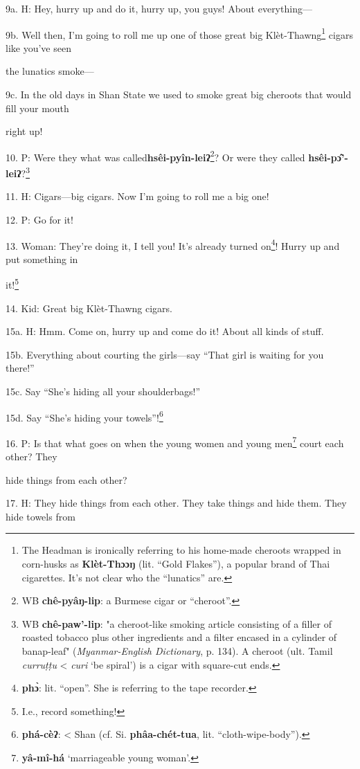 9a. H: Hey, hurry up and do it, hurry up, you guys! About everything---

9b. Well then, I'm going to roll me up one of those great big Klèt-Thawng\footnote{The Headman is ironically referring to his home-made cheroots wrapped in corn-husks as \textbf{Klèt-Thɔɔŋ} (lit. ``Gold Flakes''), a popular brand of Thai cigarettes. It's not clear who the ``lunatics'' are.}
cigars like you've seen

the lunatics smoke---

9c. In the old days in Shan State we used to smoke great big cheroots that would
fill your mouth

right up!

10. P: Were they what was called\textbf{hsêi-pyîn-leiʔ}\footnote{WB \textbf{chê-pyâŋ-lip}: a Burmese cigar or ``cheroot''.}? Or were they
called \textbf{hsêi-pɔ̂'-leiʔ}?\footnote{WB \textbf{chê-paw'-lip}: "a cheroot-like smoking article consisting of a filler of roasted tobacco plus other ingredients and a filter encased in a cylinder of banap-leaf" (\textit{Myanmar-English Dictionary}, p. 134). A cheroot (ult. Tamil \textit{curruṭṭu} < \textit{curi} `be spiral') is a cigar with square-cut ends.}

11. H: Cigars---big cigars. Now I'm going to roll me a big one!

12. P: Go for it!

13. Woman: They're doing it, I tell you! It's already turned on\footnote{\textbf{phɔ̀}: lit. ``open''. She is referring to the tape recorder.}! Hurry up
and put something in

it!\footnote{I.e., record something!}

14. Kid: Great big Klèt-Thawng cigars.

15a. H: Hmm. Come on, hurry up and come do it! About all kinds of stuff.

15b. Everything about courting the girls---say ``That girl is waiting for you there!''

15c. Say ``She's hiding all your shoulderbags!''

15d. Say ``She's hiding your towels''!\footnote{\textbf{phá-cèʔ}: < Shan (cf. Si. \textbf{phâa-chét-tua}, lit. ``cloth-wipe-body'').}

16. P: Is that what goes on when the young women and young men\footnote{\textbf{yâ-mî-há} `marriageable young woman'.} court each
other? They

hide things from each other?

17. H: They hide things from each other. They take things and hide them. They hide
towels from

